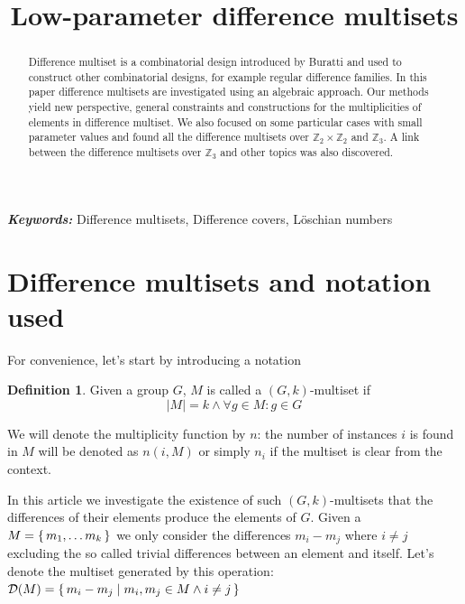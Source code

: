 \documentclass{article}
\title{Low-parameter difference multisets}
\date{}
\theoremstyle{plain}
\theoremstyle{definition}
\newtheorem{definition}[theorem]{Definition}
\theoremstyle{remark}
\providecommand{\keywords}[1]{\textbf{\textit{Keywords: }} #1}
\begin{document}
	\maketitle
	
	\begin{abstract}
		Difference multiset is a combinatorial design introduced by Buratti \cite{buratti1999old} and used to construct other combinatorial designs, for example regular difference families. In this paper difference multisets are investigated using an algebraic approach. Our methods yield new perspective, general constraints and constructions for the multiplicities of elements in difference multiset. We also focused on some particular cases with small parameter values and found all the difference multisets over $\mathbb Z_2 \times \mathbb Z_2$ and $\mathbb Z_3$. A link between the difference multisets over $\mathbb Z_3$ and other topics was also discovered.
	\end{abstract}
	
	\keywords{Difference multisets, Difference covers, Löschian numbers}

	\section{Difference multisets and notation used}
	
		For convenience, let's start by introducing a notation 
		
		\begin{definition}
			\label{dms:def:ms}
			Given a group $G$, $M$ is called a $(G,k)$-multiset if
			\begin{equation}
				|M| = k \land \forall g \in M \colon g \in G
			\end{equation}
		\end{definition}
	
		We will denote the multiplicity function by $n$: the number of instances $i$ is found in $M$ will be denoted as $n(i,M)$ or simply $n_i$ if the multiset is clear from the context.
	
		In this article we investigate the existence of such $(G,k)$-multisets that the differences of their elements produce the elements of $G$. Given a $M=\set{m_1,\ldots m_k}$ we only consider the differences $m_i-m_j$ where $i \neq j$ excluding the so called trivial differences between an element and itself. Let's denote the multiset generated by this operation: $\mathcal D (M) = \set{m_i-m_j \mid m_i, m_j \in M \land i \neq j}$
	
\end{document}

